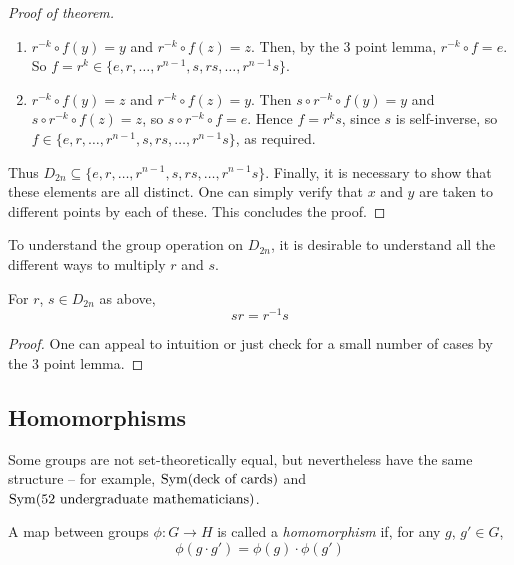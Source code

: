 \documentclass{../../template/note}
\begin{document}
\begin{proof}[Proof of theorem]
        \begin{enumerate}[label=\protect\circled{\arabic*}]
            \item \(r^{-k} \circ f(y) = y\) and \(r^{-k} \circ f(z) = z\). Then, by the 3 point lemma, \(r^{-k} \circ f = e\). So \(f = r^k \in \{e, r, \dots, r^{n-1}, s, rs, \dots, r^{n-1}s\}\).
            \item \(r^{-k} \circ f(y) = z\) and \(r^{-k} \circ f(z) = y\). Then \(s \circ r^{-k} \circ f(y) = y\) and \(s \circ r^{-k} \circ f(z) = z\), so \(s \circ r^{-k} \circ f = e\). Hence \(f = r^ks\), since \(s\) is self-inverse, so \(f \in \{e, r, \dots, r^{n-1}, s, rs, \dots, r^{n-1}s\}\), as required.
        \end{enumerate}
        
        Thus \(D_{2n} \subseteq \{e, r, \dots, r^{n-1}, s, rs, \dots, r^{n-1}s\}\). Finally, it is necessary to show that these elements are all distinct. One can simply verify that \(x\) and \(y\) are taken to different points by each of these. This concludes the proof.
        
    \end{proof}
    
    To understand the group operation on \(D_{2n}\), it is desirable to understand all the different ways to multiply \(r\) and \(s\).

    \begin{lemma}
        For \(r\), \(s \in D_{2n}\) as above,
        \[
            sr = r^{-1}s
        \]
    \end{lemma}
    
    \begin{proof}
        One can appeal to intuition or just check for a small number of cases by the 3 point lemma.
    \end{proof}
    
    
    \subsection{Homomorphisms}

    Some groups are not set-theoretically equal, but nevertheless have the same structure -- for example, \(\operatorname{Sym}(\text{deck of cards})\) and \(\operatorname{Sym}(\text{52 undergraduate mathematicians})\).

    \begin{definition}[Homomorphism]
        A map between groups \(\phi: G \to H\) is called a \emph{homomorphism} if, for any \(g\), \(g' \in G\),
        \[
            \phi(g \cdot g') = \phi(g) \cdot \phi(g')
        \]
    \end{definition}
    
\end{document}
